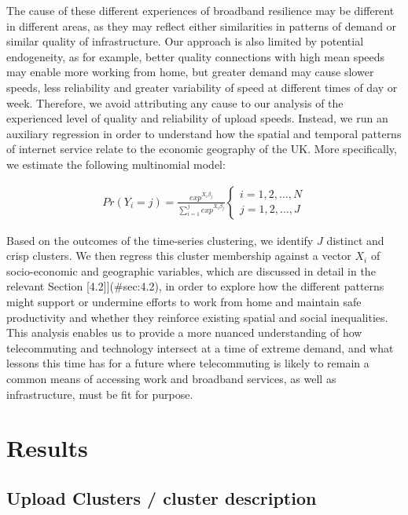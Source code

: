 \documentclass[Royal,times,sageh]{sagej}
\begin{document}
The cause of these different experiences of broadband resilience may be
different in different areas, as they may reflect either similarities in
patterns of demand or similar quality of infrastructure. Our approach is
also limited by potential endogeneity, as for example, better quality
connections with high mean speeds may enable more working from home, but
greater demand may cause slower speeds, less reliability and greater
variability of speed at different times of day or week. Therefore, we
avoid attributing any cause to our analysis of the experienced level of
quality and reliability of upload speeds. Instead, we run an auxiliary
regression in order to understand how the spatial and temporal patterns
of internet service relate to the economic geography of the UK. More
specifically, we estimate the following multinomial model:

\begin{align}
Pr(Y_{i}=j) = \frac{exp^{X_{i}\beta_{j}}}{\sum_{i=1}^j exp^{X_{i}\beta_{j}}}
\begin{cases}
    i = 1, 2, ... , N \\  
    j = 1, 2, ... , J
\end{cases}\label{eq1}
\end{align}

Based on the outcomes of the time-series clustering, we identify \(J\)
distinct and crisp clusters. We then regress this cluster membership
against a vector \(X_{i}\) of socio-economic and geographic variables,
which are discussed in detail in the relevant Section
{[}4.2{]}{]}(\#sec:4.2), in order to explore how the different patterns
might support or undermine efforts to work from home and maintain safe
productivity and whether they reinforce existing spatial and social
inequalities. This analysis enables us to provide a more nuanced
understanding of how telecommuting and technology intersect at a time of
extreme demand, and what lessons this time has for a future where
telecommuting is likely to remain a common means of accessing work and
broadband services, as well as infrastructure, must be fit for purpose.

\hypertarget{sec:4}{%
\section{Results}\label{sec:4}}

\hypertarget{sec:4.1}{%
\subsection{Upload Clusters / cluster description}\label{sec:4.1}}
\end{document}
